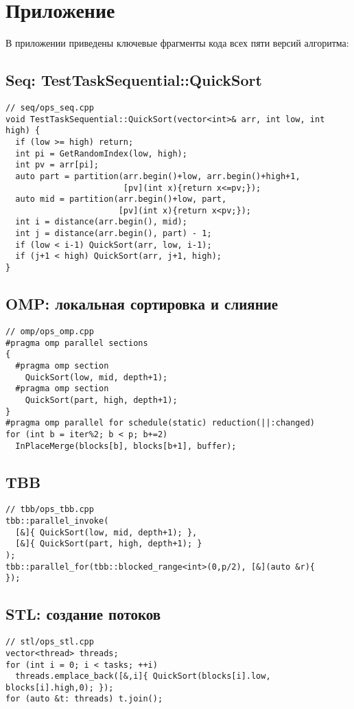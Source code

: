 \documentclass[12pt]{article}
\begin{document}
\appendix
\section*{Приложение}
\hspace*{1.25em}В приложении приведены ключевые фрагменты кода всех пяти версий алгоритма:

\subsection*{Seq: TestTaskSequential::QuickSort}
\begin{lstlisting}
// seq/ops_seq.cpp
void TestTaskSequential::QuickSort(vector<int>& arr, int low, int high) {
  if (low >= high) return;
  int pi = GetRandomIndex(low, high);
  int pv = arr[pi];
  auto part = partition(arr.begin()+low, arr.begin()+high+1,
                        [pv](int x){return x<=pv;});
  auto mid = partition(arr.begin()+low, part,
                       [pv](int x){return x<pv;});
  int i = distance(arr.begin(), mid);
  int j = distance(arr.begin(), part) - 1;
  if (low < i-1) QuickSort(arr, low, i-1);
  if (j+1 < high) QuickSort(arr, j+1, high);
}
\end{lstlisting}

\subsection*{OMP: локальная сортировка и слияние}
\begin{lstlisting}
// omp/ops_omp.cpp
#pragma omp parallel sections
{
  #pragma omp section
    QuickSort(low, mid, depth+1);
  #pragma omp section
    QuickSort(part, high, depth+1);
}
#pragma omp parallel for schedule(static) reduction(||:changed)
for (int b = iter%2; b < p; b+=2)
  InPlaceMerge(blocks[b], blocks[b+1], buffer);
\end{lstlisting}

\subsection*{TBB}
\begin{lstlisting}
// tbb/ops_tbb.cpp
tbb::parallel_invoke(
  [&]{ QuickSort(low, mid, depth+1); },
  [&]{ QuickSort(part, high, depth+1); }
);
tbb::parallel_for(tbb::blocked_range<int>(0,p/2), [&](auto &r){
});
\end{lstlisting}

\subsection*{STL: создание потоков}
\begin{lstlisting}
// stl/ops_stl.cpp
vector<thread> threads;
for (int i = 0; i < tasks; ++i)
  threads.emplace_back([&,i]{ QuickSort(blocks[i].low, blocks[i].high,0); });
for (auto &t: threads) t.join();
\end{lstlisting}
\end{document}
